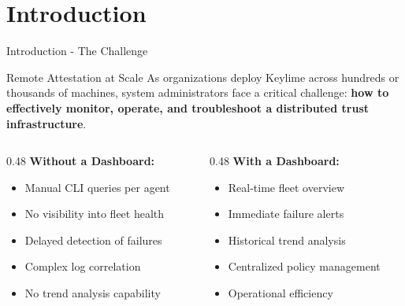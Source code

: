 \section{Introduction}

\begin{frame}{Introduction - The Challenge}
  \begin{block}{Remote Attestation at Scale}
    As organizations deploy Keylime across hundreds or thousands of machines,
    system administrators face a critical challenge: \textbf{how to effectively monitor,
    operate, and troubleshoot a distributed trust infrastructure}.
  \end{block}

  \vspace{0.3cm}

  \begin{columns}[T]
    \begin{column}{0.48\textwidth}
      \textbf{Without a Dashboard:}
      \begin{itemize}
        \item Manual CLI queries per agent
        \item No visibility into fleet health
        \item Delayed detection of failures
        \item Complex log correlation
        \item No trend analysis capability
      \end{itemize}
    \end{column}
    \begin{column}{0.48\textwidth}
      \textbf{With a Dashboard:}
      \begin{itemize}
        \item Real-time fleet overview
        \item Immediate failure alerts
        \item Historical trend analysis
        \item Centralized policy management
        \item Operational efficiency
      \end{itemize}
    \end{column}
  \end{columns}
\end{frame}

